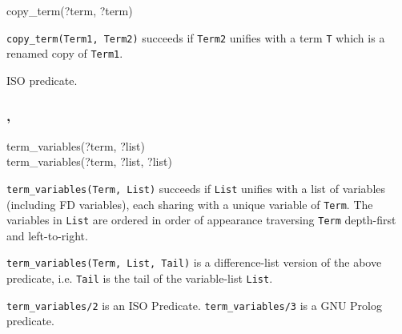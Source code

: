 \begin{TemplatesOneCol}
copy\_term(?term, ?term)

\end{TemplatesOneCol}

\Description

\texttt{copy\_term(Term1, Term2)} succeeds if \texttt{Term2} unifies with a
term \texttt{T} which is a renamed copy of \texttt{Term1}.

\PlErrorsNone

\Portability

ISO predicate.

\subsubsection{,
		}

\label{term_variables/2-3}

\begin{TemplatesOneCol}
term\_variables(?term, ?list)\\
term\_variables(?term, ?list, ?list)\\

\end{TemplatesOneCol}

\Description

\texttt{term\_variables(Term, List)} succeeds if \texttt{List} unifies with a
list of variables (including FD variables), each sharing with a unique
variable of \texttt{Term}. The variables in \texttt{List} are ordered in
order of appearance traversing \texttt{Term} depth-first and left-to-right.

\texttt{term\_variables(Term, List, Tail)} is a difference-list version of
the above predicate, i.e. \texttt{Tail} is the tail of the variable-list
\texttt{List}.

\begin{PlErrors}


\end{PlErrors}


\Portability

\texttt{term\_variables/2} is an ISO Predicate. \texttt{term\_variables/3} is a 
GNU Prolog predicate.

\subsubsection{}

